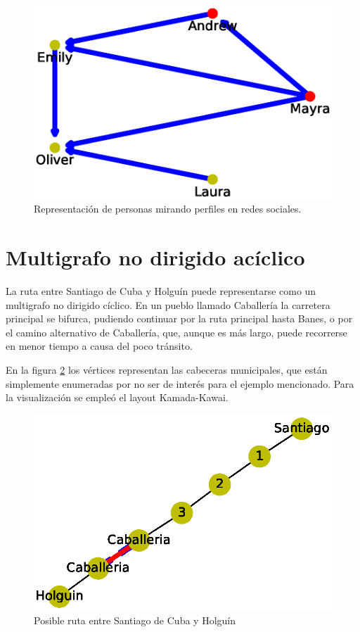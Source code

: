 \documentclass{article}
\begin{document}
\begin{figure}
\begin{center}
  \includegraphics[width=.6\columnwidth]{fig6.eps}
  \end{center}
  \caption{Representación de personas mirando perfiles en redes sociales.}
  \label{Figura 6}
\end{figure}




\section{Multigrafo no dirigido acíclico}

La ruta entre Santiago de Cuba y Holguín puede representarse  como un multigrafo no dirigido cíclico. En un pueblo llamado Caballería la carretera principal se bifurca, pudiendo continuar por la ruta principal hasta Banes, o por el camino alternativo de Caballería, que, aunque es más largo, puede recorrerse en menor tiempo a causa del poco tránsito.

En la figura \ref{Figura 7} los vértices representan las cabeceras municipales, que están simplemente enumeradas por no ser de interés para el ejemplo mencionado. Para la visualización se empleó el layout Kamada-Kawai.

\begin{figure}
  \includegraphics[width=.8\columnwidth]{fig7.eps}
  \caption{Posible ruta entre Santiago de Cuba y Holguín}
  \label{Figura 7}
\end{figure}
\end{document}
